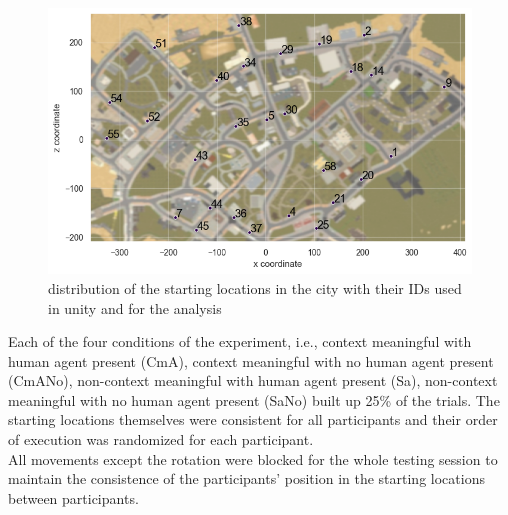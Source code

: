 \begin{figure}[h]
	\raggedright
	\includegraphics[width=140mm]{figures/starting_locations_map_color_numbered.png}
	\caption[Distribution of starting locations]{distribution of the starting locations in the city with their IDs used in unity and for the analysis}
	\label{fig:starting_locs}
\end{figure}

Each of the four conditions of the experiment, i.e., context meaningful with human agent present {\emphasize(CmA)}, context meaningful with no human agent present {\emphasize(CmANo)}, non-context meaningful with human agent present {\emphasize(Sa)}, non-context meaningful with no human agent present {\emphasize(SaNo)} built up 25\% of the trials.  The starting locations themselves were consistent for all participants and their order of execution was randomized for each participant. \\
All movements except the rotation were blocked for the whole testing session to maintain the consistence of the participants' position in the starting locations between participants. 

